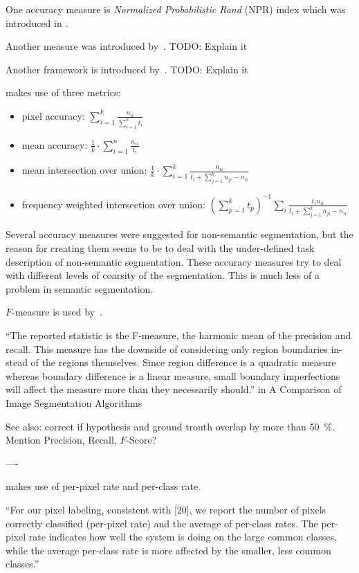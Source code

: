 One accuracy measure is \textit{Normalized Probabilistic Rand} (NPR) index
which was introduced in \cite{unnikrishnan2005measure}.

Another measure was introduced by~\cite{celebi2009improved}. TODO: Explain it

Another framework is introduced by~\cite{jaber2010probabilistic}. TODO: Explain
it

\cite{long2014fully} makes use of three metrics:

\begin{itemize}
    \item pixel accuracy: $\sum_{i=1}^k \frac{n_{ii}}{\sum_{i=1}^k t_i}$
    \item mean accuracy: $\frac{1}{k} \cdot \sum_{i=1}^n \frac{n_{ii}}{t_i}$
    \item mean intersection over union: $\frac{1}{k} \cdot \sum_{i=1}^k \frac{n_{ii}}{t_i + \sum_{j=1}^k n_{ji}-n_{ii}}$
    \item frequency weighted intersection over union:
          ${({\sum_{p=1}^k t_p})}^{-1} \sum_i \frac{t_i n_{ii}}{t_i + \sum_{j=1}^k n_{ji} - n_{ii}}$
\end{itemize}

Several accuracy measures were suggested for non-semantic
segmentation,\cite{martin2001database} but the reason for creating them seems
to be to deal with the under-defined task description of non-semantic
segmentation. These accuracy measures try to deal with different levels of
coarsity of the segmentation. This is much less of a problem in semantic
segmentation.

$F$-measure is used by~\cite{cohen2015memory}.

\enquote{The reported statistic is the F-measure, the harmonic mean of the precision
and recall. This measure has the downside of considering only region boundaries
in- stead of the regions themselves. Since region difference is a quadratic
measure whereas boundary difference is a linear measure, small boundary
imperfections will affect the measure more than they necessarily should.} in
A Comparison of Image Segmentation Algorithms

See also: \cite{yang2012layered,tighe2014scene} correct if hypothesis and
ground trouth overlap by more than \SI{50}{\percent}.
Mention Precision, Recall, $F$-Score?

----

\cite{tighe2014scene} makes use of per-pixel rate and per-class rate.

\enquote{For our pixel labeling, consistent with [20], we report the
number of pixels correctly classified (per-pixel rate) and the
average of per-class rates. The per-pixel rate indicates how
well the system is doing on the large common classes, while
the average per-class rate is more affected by the smaller,
less common classes.}

